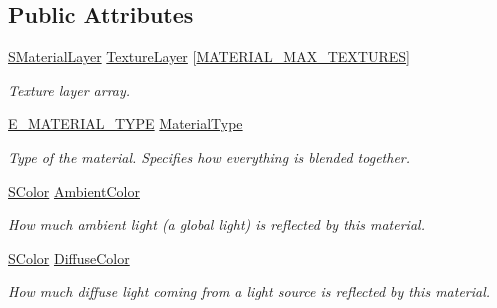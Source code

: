 \subsection*{Public Attributes}
\begin{DoxyCompactItemize}
\item 
\mbox{\label{classirr_1_1video_1_1SMaterial_a344dee541a244e864c60514e5e740cec}} 
\hyperlink{classirr_1_1video_1_1SMaterialLayer}{S\+Material\+Layer} \hyperlink{classirr_1_1video_1_1SMaterial_a344dee541a244e864c60514e5e740cec}{Texture\+Layer} \mbox{[}\hyperlink{namespaceirr_1_1video_ad41ca808200ca2e8e9d9326355020052}{M\+A\+T\+E\+R\+I\+A\+L\+\_\+\+M\+A\+X\+\_\+\+T\+E\+X\+T\+U\+R\+ES}\mbox{]}
\begin{DoxyCompactList}\small\item\em Texture layer array. \end{DoxyCompactList}\item 
\mbox{\label{classirr_1_1video_1_1SMaterial_a8cb63ab4b49ae1c61fbca8353e6b2f8a}} 
\hyperlink{namespaceirr_1_1video_ac8e9b6c66f7cebabd1a6d30cbc5430f1}{E\+\_\+\+M\+A\+T\+E\+R\+I\+A\+L\+\_\+\+T\+Y\+PE} \hyperlink{classirr_1_1video_1_1SMaterial_a8cb63ab4b49ae1c61fbca8353e6b2f8a}{Material\+Type}
\begin{DoxyCompactList}\small\item\em Type of the material. Specifies how everything is blended together. \end{DoxyCompactList}\item 
\hyperlink{classirr_1_1video_1_1SColor}{S\+Color} \hyperlink{classirr_1_1video_1_1SMaterial_a434c189b7c618c66f4d09118d30e6b4b}{Ambient\+Color}
\begin{DoxyCompactList}\small\item\em How much ambient light (a global light) is reflected by this material. \end{DoxyCompactList}\item 
\hyperlink{classirr_1_1video_1_1SColor}{S\+Color} \hyperlink{classirr_1_1video_1_1SMaterial_ac4e1aaf4751f7267eaf255496cc058df}{Diffuse\+Color}
\begin{DoxyCompactList}\small\item\em How much diffuse light coming from a light source is reflected by this material. \end{DoxyCompactList}\item 
\mbox{\label{classirr_1_1video_1_1SMaterial_a005f9acf8855681c21b3e3e7de67306f}} 

\end{DoxyCompactItemize}
